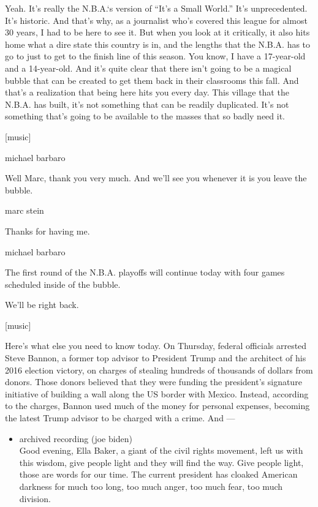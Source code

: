 Yeah. It's really the N.B.A.`s version of ``It's a Small World.'' It's
unprecedented. It's historic. And that's why, as a journalist who's
covered this league for almost 30 years, I had to be here to see it. But
when you look at it critically, it also hits home what a dire state this
country is in, and the lengths that the N.B.A. has to go to just to get
to the finish line of this season. You know, I have a 17-year-old and a
14-year-old. And it's quite clear that there isn't going to be a magical
bubble that can be created to get them back in their classrooms this
fall. And that's a realization that being here hits you every day. This
village that the N.B.A. has built, it's not something that can be
readily duplicated. It's not something that's going to be available to
the masses that so badly need it.

{[}music{]}

michael barbaro

Well Marc, thank you very much. And we'll see you whenever it is you
leave the bubble.

marc stein

Thanks for having me.

michael barbaro

The first round of the N.B.A. playoffs will continue today with four
games scheduled inside of the bubble.

We'll be right back.

{[}music{]}

Here's what else you need to know today. On Thursday, federal officials
arrested Steve Bannon, a former top advisor to President Trump and the
architect of his 2016 election victory, on charges of stealing hundreds
of thousands of dollars from donors. Those donors believed that they
were funding the president's signature initiative of building a wall
along the US border with Mexico. Instead, according to the charges,
Bannon used much of the money for personal expenses, becoming the latest
Trump advisor to be charged with a crime. And ---

\begin{itemize}
\tightlist
\item
  archived recording (joe biden)\\
  Good evening, Ella Baker, a giant of the civil rights movement, left
  us with this wisdom, give people light and they will find the way.
  Give people light, those are words for our time. The current president
  has cloaked American darkness for much too long, too much anger, too
  much fear, too much division.
\end{itemize}

